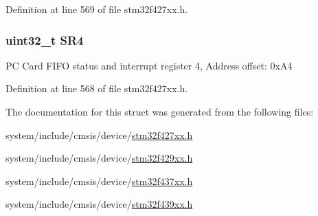 Definition at line 569 of file stm32f427xx.\+h.

\subsubsection[{\texorpdfstring{S\+R4}{SR4}}]{ uint32\+\_\+t S\+R4}\hypertarget{struct_f_m_c___bank4___type_def_a8218d6e11dae5d4468c69303dec0b4fc}{}\label{struct_f_m_c___bank4___type_def_a8218d6e11dae5d4468c69303dec0b4fc}
PC Card F\+I\+FO status and interrupt register 4, Address offset\+: 0x\+A4 

Definition at line 568 of file stm32f427xx.\+h.



The documentation for this struct was generated from the following files\+:\begin{DoxyCompactItemize}
\item 
system/include/cmsis/device/\hyperlink{stm32f427xx_8h}{stm32f427xx.\+h}\item 
system/include/cmsis/device/\hyperlink{stm32f429xx_8h}{stm32f429xx.\+h}\item 
system/include/cmsis/device/\hyperlink{stm32f437xx_8h}{stm32f437xx.\+h}\item 
system/include/cmsis/device/\hyperlink{stm32f439xx_8h}{stm32f439xx.\+h}\end{DoxyCompactItemize}
